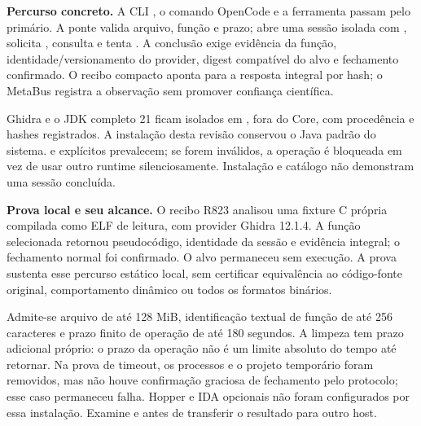 \begin{metodo}
\textbf{Percurso concreto.} A CLI , o comando
OpenCode  e a ferramenta  passam pelo primário.
A ponte valida arquivo, função e prazo; abre uma sessão isolada com
, solicita , consulta
 e tenta . A conclusão exige evidência
da função, identidade/versionamento do provider, digest compatível do alvo e
fechamento confirmado. O recibo compacto aponta para a resposta integral por
hash; o MetaBus registra a observação sem promover confiança científica.
\end{metodo}

\begin{arquitetura}
Ghidra e o JDK completo 21 ficam isolados em
, fora do Core, com procedência
e hashes registrados. A instalação desta revisão conservou o Java padrão do
sistema.  e  explícitos prevalecem;
se forem inválidos, a operação é bloqueada em vez de usar outro runtime
silenciosamente. Instalação e catálogo não demonstram uma sessão concluída.
\end{arquitetura}

\begin{resultado}
\textbf{Prova local e seu alcance.} O recibo R823 analisou uma fixture C
própria compilada como ELF de leitura, com provider Ghidra 12.1.4. A função
selecionada retornou pseudocódigo, identidade da sessão e evidência integral;
o fechamento normal foi confirmado. O alvo permaneceu sem execução.
A prova sustenta esse percurso estático local, sem certificar equivalência
ao código-fonte original, comportamento dinâmico ou todos os formatos binários.
\end{resultado}

\begin{limite}
Admite-se arquivo de até 128 MiB, identificação textual de função de até
256 caracteres e prazo finito de operação de até 180 segundos. A limpeza tem
prazo adicional próprio: o prazo da operação não é um limite absoluto do tempo
até retornar. Na prova de timeout, os processos e o projeto temporário foram
removidos, mas não houve confirmação graciosa de fechamento pelo protocolo;
esse caso permaneceu falha. Hopper e IDA opcionais não foram configurados por
essa instalação. Examine  e
 antes de transferir o resultado para outro host.
\end{limite}


